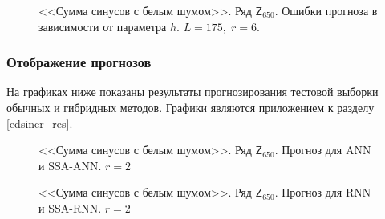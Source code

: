 \documentclass[specialist,
               substylefile = spbu.rtx,
               subf,href,colorlinks=true, 12p]{disser}
\begin{document}
\begin{figure}[H]
	\captionsetup{justification=centering}
	\caption{<<Сумма синусов с белым шумом>>. Ряд $\mathsf{Z}_{650}$. Ошибки прогноза в зависимости от параметра $h$. $L = 175, \; r = 6$.}
	\label{edsinr_r6.h}
\end{figure}

\subsubsection{Отображение прогнозов}
\label{aedsiner_res}
На графиках ниже показаны результаты прогнозирования тестовой выборки обычных и гибридных методов. Графики являются приложением к разделу \ref{edsiner_res}.

\begin{figure}[H]
	\caption{<<Сумма синусов с белым шумом>>. Ряд $\mathsf{Z}_{650}$. Прогноз для ANN и SSA-ANN. $r = 2$}
\end{figure}


\begin{figure}[H]
	\captionsetup{justification=centering}
	\caption{<<Сумма синусов с белым шумом>>. Ряд $\mathsf{Z}_{650}$. Прогноз для RNN и SSA-RNN. $r = 2$}
	\label{edsinr_r2_res_rnn}
\end{figure}
\end{document}

